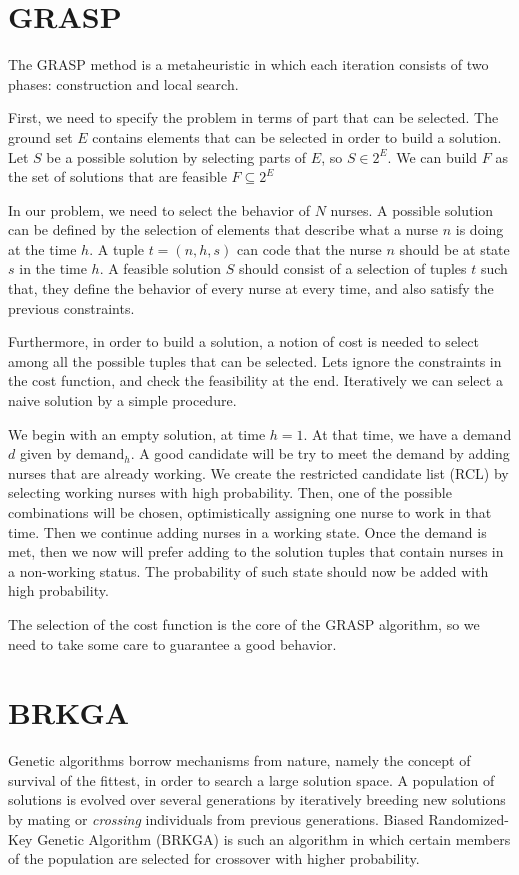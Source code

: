 \documentclass[12pt,a4paper]{article}
\begin{document}
\section{GRASP}
%
The GRASP method is a metaheuristic in which each iteration consists of two
phases: construction and local search.

First, we need to specify the problem in terms of part that can be selected. The
ground set $E$ contains elements that can be selected in order to build a
solution. Let $S$ be a possible solution by selecting parts of $E$, so $S \in
2^E$. We can build $F$ as the set of solutions that are feasible $F \subseteq
2^E$

In our problem, we need to select the behavior of $N$ nurses. A possible solution
can be defined by the selection of elements that describe what a nurse $n$ is
doing at the time $h$. A tuple $t = (n, h, s)$ can code that the nurse $n$
should be at state $s$ in the time $h$. A feasible solution $S$ should consist
of a selection of tuples $t$ such that, they define the behavior of every nurse
at every time, and also satisfy the previous constraints.

Furthermore, in order to build a solution, a notion of cost is needed to select
among all the possible tuples that can be selected. Lets ignore the constraints
in the cost function, and check the feasibility at the end. Iteratively we can
select a naive solution by a simple procedure.


We begin with an empty solution, at time $h = 1$. At that time, we have a demand $d$ given by
$\textrm{demand}_h$. A good candidate will be try to meet the demand by adding nurses that are already working. We create the restricted candidate list (RCL) by selecting working nurses with high probability. Then, one of the possible
combinations will be chosen, optimistically assigning one nurse to work in that time.
Then we continue adding nurses in a working state. Once the demand is met, then
we now will prefer adding to the solution tuples that contain nurses in a
non-working status. The probability of such state should now be added with high
probability.

The selection of the cost function is the core of the GRASP algorithm, so we
need to take some care to guarantee a good behavior.

\section{BRKGA}
%
Genetic algorithms borrow mechanisms from nature, namely the concept of survival
of the fittest, in order to search a large solution space. A population of
solutions is evolved over several generations by iteratively breeding new
solutions by mating or \textit{crossing} individuals from previous generations.
Biased Randomized-Key Genetic Algorithm (BRKGA) is such an algorithm in which
certain members of the population are selected for crossover with higher
probability.
\end{document}
